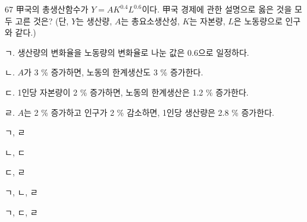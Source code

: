 \begin{question}{67}
甲국의 총생산함수가 ${ Y=AK^{ 0.4 } L^{ 0.6 } }$이다. 甲국 경제에 관한 설명으로 옳은 것을 모두 고른 것은? (단, ${ Y }$는 생산량, ${ A }$는 총요소생산성, ${ K }$는 자본량, ${ L }$은 노동량으로 인구와 같다.)
\begin{framedtext}
ㄱ. 생산량의 변화율을 노동량의 변화율로 나눈 값은 0.6으로 일정하다. \par
ㄴ. ${ A }$가 3 \% 증가하면, 노동의 한계생산도 3 \% 증가한다. \par
ㄷ. 1인당 자본량이 2 \% 증가하면, 노동의 한계생산은 1.2 \% 증가한다. \par
ㄹ. ${ A }$는 2 \% 증가하고 인구가 2 \% 감소하면, 1인당 생산량은 2.8 \% 증가한다.
\end{framedtext}
\begin{choices}
  \item ㄱ, ㄹ
  \item ㄴ, ㄷ
  \item ㄷ, ㄹ
  \item ㄱ, ㄴ, ㄹ
  \item ㄱ, ㄷ, ㄹ
\end{choices}
\end{question}
